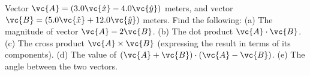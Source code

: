 Vector $\vc{A} = (3.0 \vc{\hat{x}} - 4.0 \vc{\hat{y}})$ meters, and vector $\vc{B}
= (5.0 \vc{\hat{x}} + 12.0 \vc{\hat{y}})$ meters. Find the following:
%
(a) The magnitude of vector $\vc{A} - 2\vc{B}$.\answercheck\hwendpart
%
(b) The dot product $\vc{A} \cdot \vc{B}$.\answercheck\hwendpart
%
(c) The cross product $\vc{A} \times \vc{B}$ (expressing the result in terms of its components).\answercheck\hwendpart
%
(d) The value of $(\vc{A} + \vc{B}) \cdot (\vc{A} - \vc{B})$.\answercheck\hwendpart
%
(e) The angle between the two vectors.\answercheck
